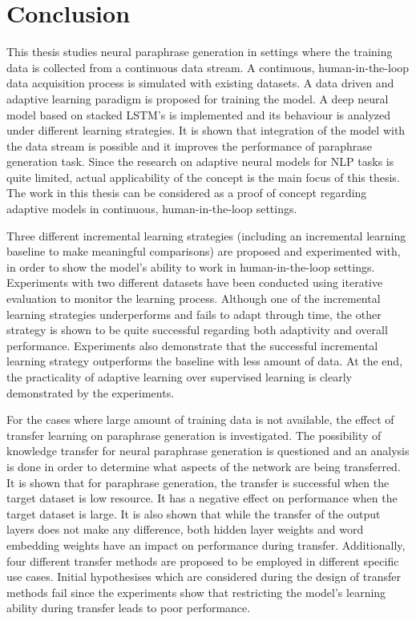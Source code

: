 \chapter{Conclusion}\label{conclusion}

This thesis studies neural paraphrase generation in settings where the training data is collected from a continuous data stream. A continuous, human-in-the-loop data acquisition process is simulated with existing datasets. A data driven and adaptive learning paradigm is proposed for training the model. A deep neural model based on stacked LSTM's is implemented and its behaviour is analyzed under different learning strategies. It is shown that integration of the model with the data stream is possible and it improves the performance of paraphrase generation task. Since the research on adaptive neural models for NLP tasks is quite limited, actual applicability of the concept is the main focus of this thesis. The work in this thesis can be considered as a proof of concept regarding adaptive models in continuous, human-in-the-loop settings.

Three different incremental learning strategies (including an incremental learning baseline to make meaningful comparisons) are proposed and experimented with, in order to show the model's ability to work in human-in-the-loop settings. Experiments with two different datasets have been conducted using iterative evaluation to monitor the learning process. Although one of the incremental learning strategies underperforms and fails to adapt through time, the other strategy is shown to be quite successful regarding both adaptivity and overall performance. Experiments also demonstrate that the successful incremental learning strategy outperforms the baseline with less amount of data. At the end, the practicality of adaptive learning over supervised learning is clearly demonstrated by the experiments.

For the cases where large amount of training data is not available, the effect of transfer learning on paraphrase generation is investigated. The possibility of knowledge transfer for neural paraphrase generation is questioned and an analysis is done in order to determine what aspects of the network are being transferred. It is shown that for paraphrase generation, the transfer is successful when the target dataset is low resource. It has a negative effect on performance when the target dataset is large. It is also shown that while the transfer of the output layers does not make any difference, both hidden layer weights and word embedding weights have an impact on performance during transfer. Additionally, four different transfer methods are proposed to be employed in different specific use cases. Initial hypothesises which are considered during the design of transfer methods fail since the experiments show that restricting the model's learning ability during transfer leads to poor performance.

